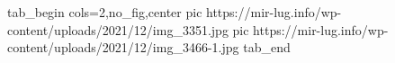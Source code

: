  
 
 
 
 


\ifcmt
  tab_begin cols=2,no_fig,center
     pic https://mir-lug.info/wp-content/uploads/2021/12/img_3351.jpg
		 pic https://mir-lug.info/wp-content/uploads/2021/12/img_3466-1.jpg
  tab_end
\fi
